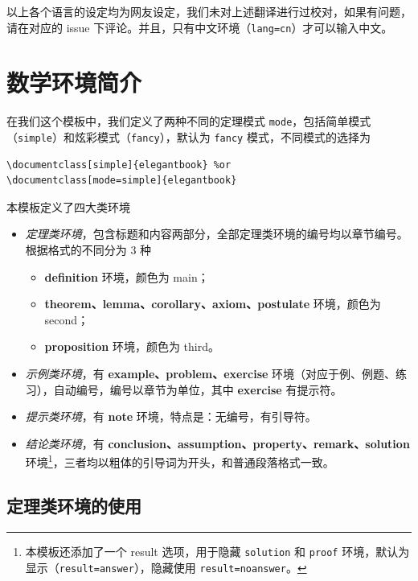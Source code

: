 \documentclass[lang=cn,10pt]{elegantbook}
\begin{document}
\begin{remark}
以上各个语言的设定均为网友设定，我们未对上述翻译进行过校对，如果有问题，请在对应的 issue 下评论。并且，只有中文环境（\lstinline{lang=cn}）才可以输入中文。
\end{remark}



\section{数学环境简介}

在我们这个模板中，我们定义了两种不同的定理模式 \lstinline{mode}，包括简单模式（\lstinline{simple}）和炫彩模式（\lstinline{fancy}），默认为 \lstinline{fancy} 模式，不同模式的选择为
\begin{lstlisting}
\documentclass[simple]{elegantbook} %or
\documentclass[mode=simple]{elegantbook}
\end{lstlisting}

本模板定义了四大类环境

\begin{itemize}
  \item \textit{定理类环境}，包含标题和内容两部分，全部定理类环境的编号均以章节编号。根据格式的不同分为 3 种
    \begin{itemize}
      \item \textcolor{main}{\textbf{definition}} 环境，颜色为 \textcolor{main}{main}；
      \item \textcolor{second}{\textbf{theorem、lemma、corollary、axiom、postulate}} 环境，颜色为 \textcolor{second} {second}；
      \item \textcolor{third}{\textbf{proposition}} 环境，颜色为 \textcolor{third}{third}。
    \end{itemize}
  \item \textit{示例类环境}，有 \textbf{example、problem、exercise} 环境（对应于例、例题、练习），自动编号，编号以章节为单位，其中 \textbf{exercise} 有提示符。
  \item \textit{提示类环境}，有 \textbf{note} 环境，特点是：无编号，有引导符。
  \item \textit{结论类环境}，有 \textbf{conclusion、assumption、property、remark、solution} 环境\footnote{本模板还添加了一个 result 选项，用于隐藏 \lstinline{solution} 和 \lstinline{proof} 环境，默认为显示（\lstinline{result=answer}），隐藏使用 \lstinline{result=noanswer}。}，三者均以粗体的引导词为开头，和普通段落格式一致。
\end{itemize}

\subsection{定理类环境的使用}
\end{document}
